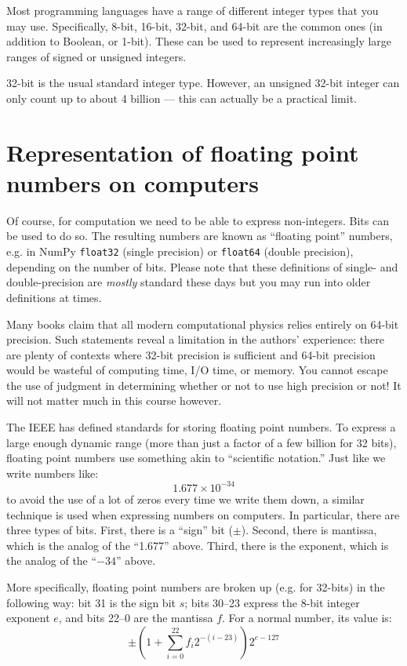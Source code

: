 Most programming languages have a range of different integer types
that you may use. Specifically, 8-bit, 16-bit, 32-bit, and 64-bit are
the common ones (in addition to Boolean, or 1-bit).  These can be used
to represent increasingly large ranges of signed or unsigned integers.

32-bit is the usual standard integer type. However, an unsigned 32-bit
integer can only count up to about 4 billion --- this can actually be
a practical limit. 

\section{Representation of floating point numbers on computers}

Of course, for computation we need to be able to express
non-integers. Bits can be used to do so. The resulting numbers are
known as ``floating point'' numbers, e.g. in NumPy {\tt float32}
(single precision) or {\tt float64} (double precision), depending on
the number of bits. Please note that these definitions of single- and
double-precision are {\it mostly} standard these days but you may run
into older definitions at times.

Many books claim that all modern computational physics relies entirely
on 64-bit precision. Such statements reveal a limitation in the
authors' experience: there are plenty of contexts where 32-bit
precision is sufficient and 64-bit precision would be wasteful of
computing time, I/O time, or memory. You cannot escape the use of
judgment in determining whether or not to use high precision or not!
It will not matter much in this course however.

The IEEE has defined standards for storing floating point numbers.  To
express a large enough dynamic range (more than just a factor of a few
billion for 32 bits), floating point numbers use something akin to
``scientific notation.'' Just like we write numbers like:
\begin{equation}
1.677 \times 10^{-34}
\end{equation}
to avoid the use of a lot of zeros every time we write them down, a
similar technique is used when expressing numbers on computers. In
particular, there are three types of bits. First, there is a ``sign''
bit ($\pm$). Second, there is mantissa, which is the analog of the
``1.677'' above. Third, there is the exponent, which is the analog of
the ``$-34$'' above.

More specifically, floating point numbers are broken up (e.g. for
32-bits) in the following way: bit 31 is the sign bit $s$; bits 30--23
express the 8-bit integer exponent $e$, and bits 22--0 are the
mantissa $f$. For a normal number, its value is:
\begin{equation}
\pm \left(1 + \sum_{i=0}^{22} f_i 2^{-(i-23)} \right) 2^{e-127}
\end{equation}


